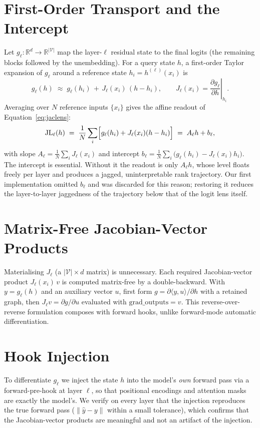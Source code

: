 \section{First-Order Transport and the Intercept}
Let $g_\ell:\mathbb{R}^d \to \mathbb{R}^{|\mathcal{V}|}$ map the layer-$\ell$ residual state to the final
logits (the remaining blocks followed by the unembedding). For a query state $h$, a first-order Taylor
expansion of $g_\ell$ around a reference state $h_i = h^{(\ell)}(x_i)$ is
\begin{equation}
  g_\ell(h) \;\approx\; g_\ell(h_i) \,+\, J_\ell(x_i)\,(h - h_i),
  \qquad J_\ell(x_i) = \left.\frac{\partial g_\ell}{\partial h}\right|_{h_i}.
\end{equation}
Averaging over $N$ reference inputs $\{x_i\}$ gives the affine readout of Equation~\eqref{eq:jaclens}:
\begin{equation}
  \mathrm{JL}_\ell(h) \;=\; \frac{1}{N}\sum_i \Bigl[g_\ell(h_i) + J_\ell(x_i)(h-h_i)\Bigr]
                    \;=\; A_\ell h + b_\ell,
\end{equation}
with slope $A_\ell = \tfrac{1}{N}\sum_i J_\ell(x_i)$ and intercept $b_\ell = \tfrac{1}{N}\sum_i
\bigl(g_\ell(h_i) - J_\ell(x_i) h_i\bigr)$. The intercept is essential. Without it the readout is only
$A_\ell h$, whose level floats freely per layer and produces a jagged, uninterpretable rank trajectory. Our
first implementation omitted $b_\ell$ and was discarded for this reason; restoring it reduces the
layer-to-layer jaggedness of the trajectory below that of the logit lens itself.

\section{Matrix-Free Jacobian-Vector Products}
Materialising $J_\ell$ (a $|\mathcal{V}|\times d$ matrix) is unnecessary. Each required
Jacobian-vector product $J_\ell(x_i)\,v$ is computed matrix-free by a double-backward. With $y = g_\ell(h)$
and an auxiliary vector $u$, first form $g = \partial\langle y,u\rangle/\partial h$ with a retained graph,
then $J_\ell v = \partial g / \partial u$ evaluated with $\mathrm{grad\_outputs}=v$. This reverse-over-reverse
formulation composes with forward hooks, unlike forward-mode automatic differentiation.

\section{Hook Injection}
To differentiate $g_\ell$ we inject the state $h$ into the model's \emph{own} forward pass via a
forward-pre-hook at layer $\ell$, so that positional encodings and attention masks are exactly the model's.
We verify on every layer that the injection reproduces the true forward pass ($\|\hat y - y\|$ within a
small tolerance), which confirms that the Jacobian-vector products are meaningful and not an artifact of the
injection.

